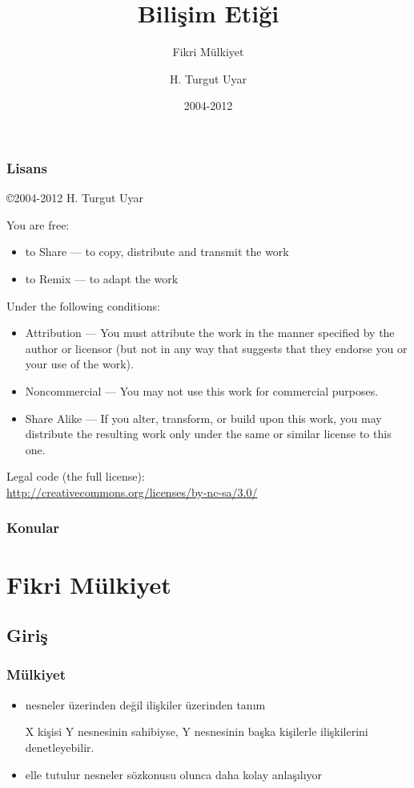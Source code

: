 \documentclass[dvipsnames]{beamer}
\title{Bilişim Etiği}
\subtitle{Fikri Mülkiyet}
\author{H. Turgut Uyar}
\date{2004-2012}
\theoremstyle{definition}
\theoremstyle{example}
\theoremstyle{plain}
\begin{document}
\begin{frame}
  \titlepage
\end{frame}

\begin{frame}
  \frametitle{Lisans}

  \hfill
  \copyright 2004-2012 H. Turgut Uyar

  \vfill
  \begin{tiny}
    You are free:
    \begin{itemize}
      \item to Share — to copy, distribute and transmit the work
      \item to Remix — to adapt the work
    \end{itemize}

    Under the following conditions:
    \begin{itemize}
      \item Attribution — You must attribute the work in the manner specified by
        the author or licensor (but not in any way that suggests that they
        endorse you or your use of the work).

      \item Noncommercial — You may not use this work for commercial purposes.

      \item Share Alike — If you alter, transform, or build upon this work, you
        may distribute the resulting work only under the same or similar license
        to this one.
    \end{itemize}
  \end{tiny}

  \vfill
  Legal code (the full license):\\
  \url{http://creativecommons.org/licenses/by-nc-sa/3.0/}
\end{frame}

\begin{frame}
  \frametitle{Konular}
  \tableofcontents
\end{frame}

\section{Fikri Mülkiyet}

\subsection{Giriş}

\begin{frame}
  \frametitle{Mülkiyet}

  \begin{itemize}
    \item nesneler üzerinden değil ilişkiler üzerinden tanım

    \medskip
    X kişisi Y nesnesinin sahibiyse, Y nesnesinin başka kişilerle ilişkilerini
    denetleyebilir.

    \pause
    \medskip
    \item elle tutulur nesneler sözkonusu olunca daha kolay anlaşılıyor
  \end{itemize}
\end{frame}
\end{document}
